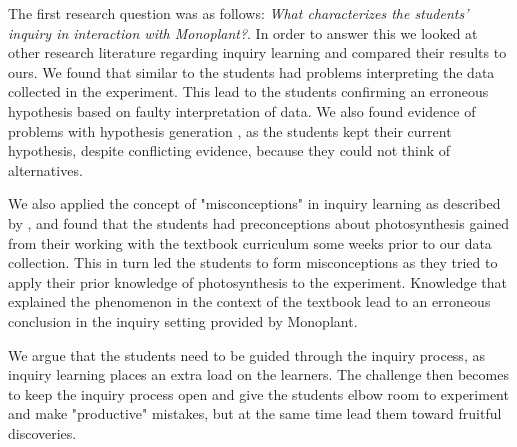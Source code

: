 The first research question was as follows: \emph{What characterizes the students’ inquiry in interaction with Monoplant?}. In order to answer this we looked at other research literature regarding inquiry learning and compared their results to ours. We found that similar to \citeauthor{klahr1993heuristics} \citetext{\citeyear{klahr1993heuristics}, referenced in \citealp{de1998scientific}} the students had problems interpreting the data collected in the experiment. This lead to the students confirming an erroneous hypothesis based on faulty interpretation of data. We also found evidence of problems with hypothesis generation \citep{de1998scientific}, as the students kept their current hypothesis, despite conflicting evidence, because they could not think of alternatives. 

We also applied the concept of "misconceptions" in inquiry learning as described by \citet{gomez2008elementary,smith1994misconceptions}, and found that the students had preconceptions about photosynthesis gained from their working with the textbook curriculum some weeks prior to our data collection. This in turn led the students to form misconceptions as they tried to apply their prior knowledge of photosynthesis to the experiment. Knowledge that explained the phenomenon in the context of the textbook lead to an erroneous conclusion in the inquiry setting provided by Monoplant. %

We argue that the students need to be guided through the inquiry process, as inquiry learning places an extra load on the learners. The challenge then becomes to keep the inquiry process open and give the students elbow room to experiment and make "productive" mistakes, but at the same time lead them toward fruitful discoveries. 



